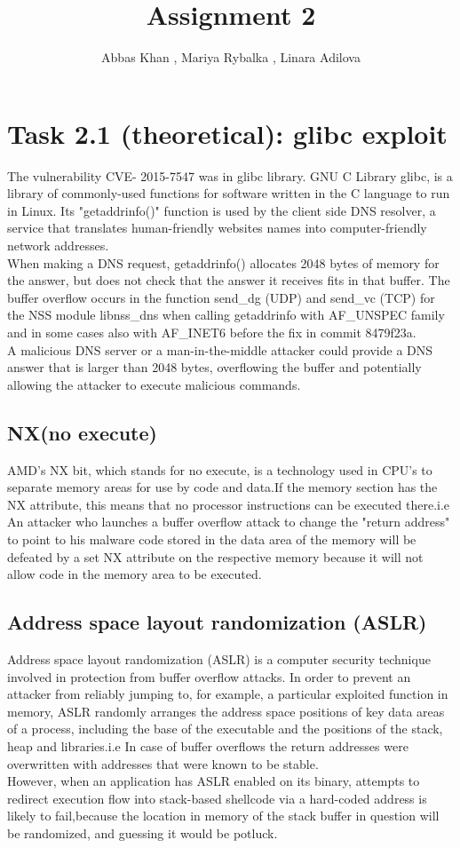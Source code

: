\documentclass{article}
\title{Assignment 2}
\author{Abbas Khan , Mariya Rybalka , Linara Adilova}
\begin{document}
\maketitle 
    
\section*{Task 2.1 (theoretical): glibc exploit}
    The vulnerability CVE- 2015-7547 was in glibc library. GNU C Library glibc, is a library of commonly-used functions for software written in the C language to run in Linux. Its "getaddrinfo()" function is used by the client side DNS resolver, a service that translates human-friendly websites names into computer-friendly network addresses.
\\
When making a DNS request, getaddrinfo() allocates 2048 bytes of memory for the answer, but does not check that the answer it receives fits in that buffer. The buffer overflow occurs in the function send{\_}dg (UDP) and send{\_}vc (TCP) for the NSS module libnss{\_}dns when calling getaddrinfo with AF{\_}UNSPEC family and in some cases also with AF{\_}INET6 before the fix in
commit 8479f23a.
\\
A malicious DNS server or a man-in-the-middle attacker could provide a DNS answer that is larger than 2048 bytes, overflowing the buffer and potentially allowing the attacker to execute malicious commands.
	  
\subsection*{NX(no execute)}
AMD's NX bit, which stands for no execute, is a technology used in CPU's to separate memory areas
for use by code and data.If the memory section has the NX attribute, this means that no processor instructions can be executed there.i.e An attacker who launches a buffer overflow attack to change
the "return address" to point to his malware code stored in the data area of the memory will be 
defeated by a set NX attribute on the respective memory because it will not allow code in the
memory area to be executed. 
	 
\subsection*{Address space layout randomization (ASLR)}
Address space layout randomization (ASLR) is a computer security technique involved in protection from buffer overflow attacks. In order to prevent an attacker from reliably jumping to, for example, a particular exploited function in memory, ASLR randomly arranges the address space positions of key data areas of a process, including the base of the executable and the positions of the stack, heap and libraries.i.e In case of buffer overflows the return addresses were overwritten with addresses that were known to be stable.
\\
However, when an application has ASLR enabled on its binary, attempts to redirect execution flow
into stack-based shellcode via a hard-coded address is likely to fail,because the location in 
memory of the stack buffer in question will be randomized, and guessing it would be potluck.
\end{document}
